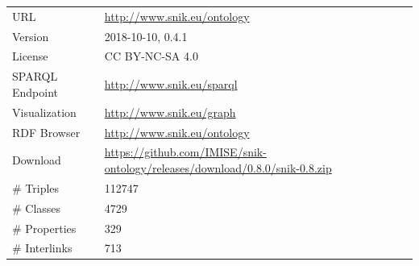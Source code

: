 \documentclass[sw]{iosart2x}
\begin{document}
\begin{tabulary}{\columnwidth}{lL}
\toprule
URL		&\url{http://www.snik.eu/ontology}\\
Version		&2018-10-10, 0.4.1\\
License		&CC BY-NC-SA 4.0\\
SPARQL Endpoint	&\url{http://www.snik.eu/sparql}\\
Visualization	&\url{http://www.snik.eu/graph}\\
RDF Browser	&\url{http://www.snik.eu/ontology}\\
Download	&\url{https://github.com/IMISE/snik-ontology/releases/download/0.8.0/snik-0.8.zip}\\
\# Triples	&\num{112747}\\
\# Classes	&\num{4729}\\
\# Properties	&\num{329}\\
\# Interlinks	&\num{713}\\
\bottomrule
\end{tabulary}%
\end{document}
